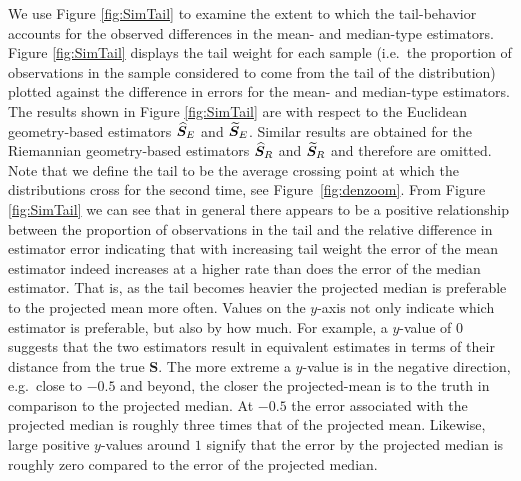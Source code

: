 
We use Figure \ref{fig:SimTail} to examine the  extent to which the tail-behavior accounts for the observed differences in the mean- and median-type estimators. Figure \ref{fig:SimTail} displays the tail weight for each sample (i.e.~the proportion of observations in the sample considered to come from the tail of the distribution) plotted against the difference in errors for the mean- and median-type estimators.  The results shown in Figure \ref{fig:SimTail} are with respect to the Euclidean geometry-based estimators ${\widehat{\bm S}_E}$ and ${\widetilde{\bm S}_E}$. Similar results are obtained for the Riemannian geometry-based estimators ${\widehat{\bm S}_R}$ and ${\widetilde{\bm S}_R}$ and therefore are omitted. Note that we define the tail to be the average crossing point at which the distributions cross for the second time, see Figure~\ref{fig:denzoom}. From  Figure \ref{fig:SimTail} we can see that in general there appears to be a positive relationship between the proportion of observations in the tail and the relative difference in estimator error indicating that with increasing tail weight the error of the mean estimator indeed increases at a higher rate than does the error of the median estimator. That is, as the tail becomes heavier the projected median is preferable to the projected mean more often.  
Values on the $y$-axis not only indicate which estimator is preferable, but also by how much.  For example, a $y$-value of 0 suggests that the two estimators result in equivalent estimates in terms of their distance from the true $\bm S$.  The more extreme a $y$-value is in the negative direction, e.g.~close to $-0.5$ and beyond, the closer the projected-mean is to the truth in comparison to the projected median. At $-0.5$ the error associated with the projected median is roughly three times that of the projected mean.  Likewise,  large positive $y$-values around $1$ signify that the error by the projected median is roughly zero compared to the error of the projected median.


